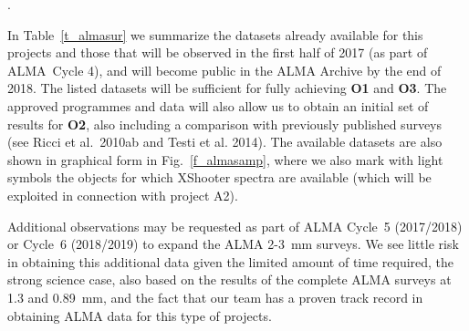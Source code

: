 \documentclass[10pt,fleqn,twoside]{article}
\begin{document}
\vspace{1em}{\Tcol\bf ALMA Data for objectives O1, O2, and O3}.

In Table~\ref{t_almasur} we summarize the datasets already available for this projects and those that will be observed in the first half of 2017 (as part of ALMA~Cycle 4), and will become public in the ALMA Archive by the end of 2018. The listed datasets will be sufficient for fully achieving {\bf O1} and {\bf O3}. The approved programmes and data will also allow us to obtain an initial set of results for {\bf O2}, also including a comparison with previously published surveys (see Ricci et al.~2010ab and Testi et al. 2014).
The available datasets are also shown in graphical form in Fig.~\ref{f_almasamp}, where we also mark with light symbols the objects for which XShooter spectra are available (which will be exploited in connection with project A2).

Additional observations may be requested as part of ALMA Cycle~5 (2017/2018) or Cycle~6 (2018/2019) to expand the ALMA 2-3~mm surveys. We see little risk in obtaining this additional data given the limited amount of time required, the strong science case, also based on the results of the complete ALMA surveys at 1.3 and 0.89~mm, and the fact that our team has a proven track record in obtaining ALMA data for this type of projects.
\end{document}
